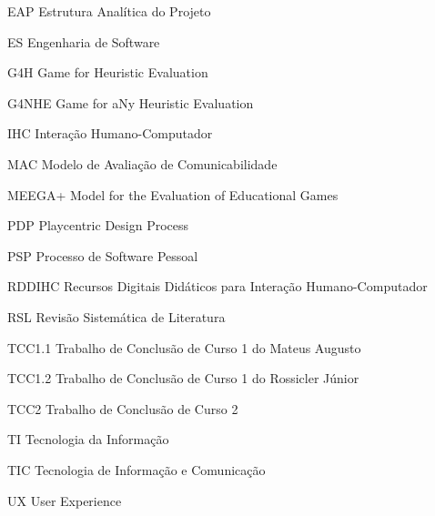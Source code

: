 \begin{siglas}
  \item[EAP] Estrutura Analítica do Projeto
  \item[ES] Engenharia de Software
  \item[G4H] Game for Heuristic Evaluation 
  \item[G4NHE] Game for aNy Heuristic Evaluation
  \item[IHC] Interação Humano-Computador
  \item[MAC] Modelo de Avaliação de Comunicabilidade
  \item[MEEGA+] Model for the Evaluation of Educational Games
  \item[PDP] Playcentric Design Process
  \item[PSP] Processo de Software Pessoal
  \item[RDDIHC] Recursos Digitais Didáticos para Interação Humano-Computador
  \item[RSL] Revisão Sistemática de Literatura
  \item[TCC1.1] Trabalho de Conclusão de Curso 1 do Mateus Augusto
  \item[TCC1.2] Trabalho de Conclusão de Curso 1 do Rossicler Júnior
  \item[TCC2] Trabalho de Conclusão de Curso 2
  \item[TI] Tecnologia da Informação
  \item[TIC] Tecnologia de Informação e Comunicação
  \item[UX] User Experience

\end{siglas}
